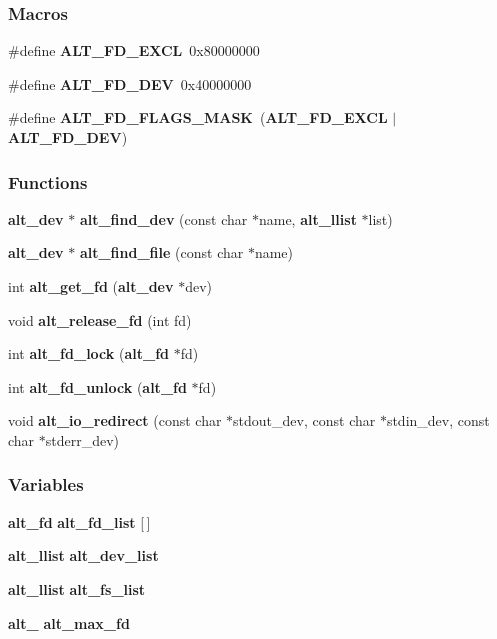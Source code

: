 \subsubsection*{Macros}
\begin{DoxyCompactItemize}
\item 
\#define {\bf A\+L\+T\+\_\+\+F\+D\+\_\+\+E\+X\+CL}~0x80000000
\item 
\#define {\bf A\+L\+T\+\_\+\+F\+D\+\_\+\+D\+EV}~0x40000000
\item 
\#define {\bf A\+L\+T\+\_\+\+F\+D\+\_\+\+F\+L\+A\+G\+S\+\_\+\+M\+A\+SK}~({\bf A\+L\+T\+\_\+\+F\+D\+\_\+\+E\+X\+CL} $\vert$ {\bf A\+L\+T\+\_\+\+F\+D\+\_\+\+D\+EV})
\end{DoxyCompactItemize}
\subsubsection*{Functions}
\begin{DoxyCompactItemize}
\item 
{\bf alt\+\_\+dev} $\ast$ {\bf alt\+\_\+find\+\_\+dev} (const char $\ast$name, {\bf alt\+\_\+llist} $\ast$list)
\item 
{\bf alt\+\_\+dev} $\ast$ {\bf alt\+\_\+find\+\_\+file} (const char $\ast$name)
\item 
int {\bf alt\+\_\+get\+\_\+fd} ({\bf alt\+\_\+dev} $\ast$dev)
\item 
void {\bf alt\+\_\+release\+\_\+fd} (int fd)
\item 
int {\bf alt\+\_\+fd\+\_\+lock} ({\bf alt\+\_\+fd} $\ast$fd)
\item 
int {\bf alt\+\_\+fd\+\_\+unlock} ({\bf alt\+\_\+fd} $\ast$fd)
\item 
void {\bf alt\+\_\+io\+\_\+redirect} (const char $\ast$stdout\+\_\+dev, const char $\ast$stdin\+\_\+dev, const char $\ast$stderr\+\_\+dev)
\end{DoxyCompactItemize}
\subsubsection*{Variables}
\begin{DoxyCompactItemize}
\item 
{\bf alt\+\_\+fd} {\bf alt\+\_\+fd\+\_\+list} [$\,$]
\item 
{\bf alt\+\_\+llist} {\bf alt\+\_\+dev\+\_\+list}
\item 
{\bf alt\+\_\+llist} {\bf alt\+\_\+fs\+\_\+list}
\item 
{\bf alt\+\_} {\bf alt\+\_\+max\+\_\+fd}
\end{DoxyCompactItemize}


